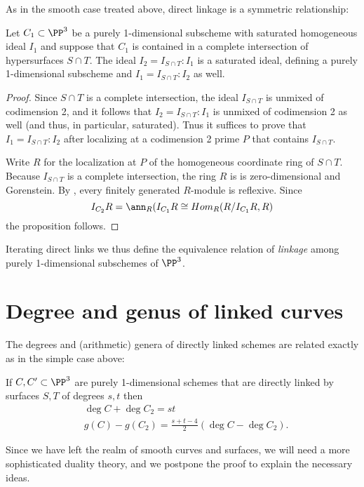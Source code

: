 As in the smooth case treated above, direct linkage is a symmetric relationship:
\begin{proposition}
Let $C_1\subset \PP^3$ be a purely 1-dimensional subscheme with saturated homogeneous ideal $I_1$ and suppose that $C_1$ is contained in a complete intersection of
hypersurfaces $S\cap T$. The ideal $I_2 = I_{S\cap T}:I_1$ is a saturated ideal, defining a purely 1-dimensional subscheme and 
$I_1 = I_{S\cap T}: I_2$ as well.
\end{proposition}
 
\begin{proof}
Since $S\cap T$ is a complete intersection, the ideal $I_{S\cap T}$ is unmixed of codimension 2, and it follows
that $I_2 = I_{S\cap T}:I_1$ is unmixed of codimension 2 as well (and thus, in particular, saturated).
Tnus it suffices to prove that $I_1 = I_{S\cap T}: I_2$ after localizing at a codimension 2 prime $P$
that contains $I_{S\cap T}$. 

Write $R$ for the localization at $P$ of the homogeneous coordinate ring of $S\cap T$. 
Because $I_{S\cap T}$ is a complete intersection, the ring $R$ is
 is zero-dimensional and Gorenstein.
By \cite[***]{Eisenbud1995}, every finitely generated $R$-module is reflexive. Since 
$$
I_{C_2}R= \ann_{R}(I_{C_1}R \cong Hom_R(R/I_{C_1}R, R)
$$
the proposition follows.
\end{proof}

Iterating direct links we thus define the equivalence relation of \emph{linkage} among purely 1-dimensional subschemes
of $\PP^3$.

\section{Degree and genus of linked curves}

The degrees and (arithmetic) genera 
of directly linked schemes are related exactly as in the simple case above:

\begin{theorem}\label{direct linkage}\label{linked genus formula}
If $C,{C'}\subset \PP^3$ are purely 1-dimensional schemes that are directly linked by surfaces $S,T$ of degrees $s,t$  then 
$$
\begin{aligned}
&\deg C+\deg C_2 = st\\
&g(C) - g({C_2}) = \frac{s+t-4}{2}(\deg C-\deg {C_2}).
\end{aligned}
 $$
\end{theorem}

Since we have left the realm of smooth curves and surfaces, we will need a more sophisticated duality theory, and we
postpone the proof to explain the necessary ideas.

